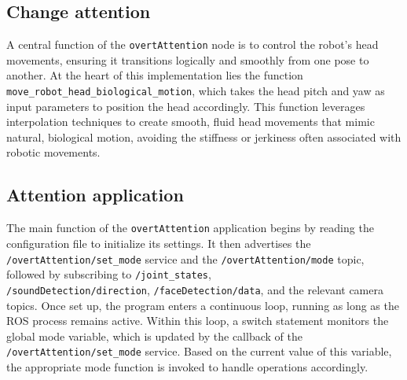 \documentclass{CSSRforAfrica}
\begin{document}
\subsection{Change attention}
A central function of the \texttt{overtAttention} node is to control the robot's head movements, ensuring it transitions logically and smoothly from one pose to another. At the heart of this implementation lies the function \texttt{move\_robot\_head\_biological\_motion}, which takes the head pitch and yaw as input parameters to position the head accordingly. This function leverages interpolation techniques to create smooth, fluid head movements that mimic natural, biological motion, avoiding the stiffness or jerkiness often associated with robotic movements.


\subsection{Attention application}
The main function of the \texttt{overtAttention} application begins by reading the configuration file to initialize its settings. It then advertises the \texttt{/overtAttention/set\_mode} service and the \texttt{/overtAttention/mode} topic, followed by subscribing to \texttt{/joint\_states},\\ \texttt{/soundDetection/direction}, \texttt{/faceDetection/data}, and the relevant camera topics. Once set up, the program enters a continuous loop, running as long as the ROS process remains active. Within this loop, a switch statement monitors the global mode variable, which is updated by the callback of the \texttt{/overtAttention/set\_mode} service. Based on the current value of this variable, the appropriate mode function is invoked to handle operations accordingly.

\end{document}
